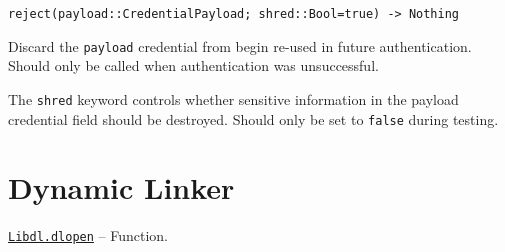 \begin{adjustwidth}{2em}{0pt}


\begin{verbatim}
reject(payload::CredentialPayload; shred::Bool=true) -> Nothing
\end{verbatim}

Discard the \texttt{payload} credential from begin re-used in future authentication. Should only be called when authentication was unsuccessful.

The \texttt{shred} keyword controls whether sensitive information in the payload credential field should be destroyed. Should only be set to \texttt{false} during testing.



\end{adjustwidth}

\hypertarget{479481607251993608}{}


\chapter{Dynamic Linker}


\hypertarget{8171750449393676854}{} 
\hyperlink{8171750449393676854}{\texttt{Libdl.dlopen}}  -- {Function.}

